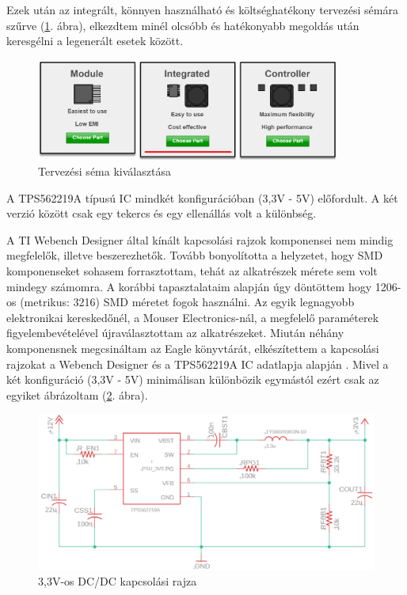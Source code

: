 \documentclass[../main.tex]{subfiles}
\begin{document}
            Ezek után az integrált, könnyen használható és költséghatékony tervezési sémára szűrve (\ref{fig:ti_we_des_int_etu_ce_method}. ábra), elkezdtem minél olcsóbb és hatékonyabb megoldás után keresgélni a legenerált esetek között.
            
            \begin{figure}[h!]
                \centering
                    \includegraphics[width=10cm]{resources/pcb_res/ti_we_des_int_etu_ce_method_2.png}
                \caption{Tervezési séma kiválasztása\cite{ti_webench}}
                \label{fig:ti_we_des_int_etu_ce_method}
            \end{figure}
            
            A TPS562219A típusú IC mindkét konfigurációban (3,3V - 5V) előfordult. A két verzió között %
            csak egy tekercs és egy ellenállás volt a különbség.
            
            A TI Webench Designer által kínált kapcsolási rajzok komponensei nem mindig megfelelők, illetve beszerezhetők. Tovább bonyolította a helyzetet, hogy SMD komponenseket sohasem forrasztottam, tehát az alkatrészek mérete sem volt mindegy számomra. A korábbi tapasztalataim alapján úgy döntöttem hogy 1206-os (metrikus: 3216) SMD méretet fogok használni. Az egyik legnagyobb elektronikai kereskedőnél, a Mouser Electronics-nál, a megfelelő paraméterek figyelembevételével újraválasztottam az alkatrészeket. Miután néhány komponensnek megcsináltam az Eagle könyvtárát, elkészítettem a kapcsolási rajzokat a Webench Designer és a TPS562219A IC adatlapja alapján \cite{ds_tps56}. Mivel a két konfiguráció (3,3V - 5V) minimálisan különbözik egymástól ezért csak az egyiket ábrázoltam (\ref{fig:schematic_3v3}. ábra).
            
            \begin{figure}[h!]
                \centering
                    \includegraphics[width=12cm]{resources/pcb_res/schematic_3v3.png}
                \caption{3,3V-os DC/DC kapcsolási rajza}
                \label{fig:schematic_3v3}
            \end{figure}
            
\end{document}
